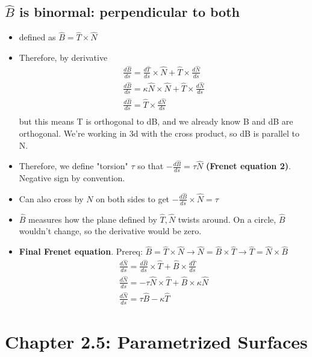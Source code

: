 \documentclass[11pt, oneside]{article}   	%
\begin{document}
\subsection{$\hat{B}$ is binormal: perpendicular to both}
\begin{itemize}
\item defined as $\hat{B} = \hat{T} \times \hat{N}$
\item Therefore, by derivative 
\begin{align}
\frac{d\hat{B}}{ds} = \frac{d\hat{T}}{ds} \times \hat{N} +  \hat{T} \times \frac{d\hat{N}}{ds}\\ 
\frac{d\hat{B}}{ds} = \kappa \hat{N} \times \hat{N}  +  \hat{T} \times \frac{d\hat{N}}{ds}\\ 
\frac{d\hat{B}}{ds} =  \hat{T} \times \frac{d\hat{N}}{ds}\\ 
\end{align}
but this means T is orthogonal to dB, and we already know B and dB are orthogonal.
We're working in 3d with the cross product, so dB is parallel to N.
\item Therefore, we define "torsion" $\tau$ so that $- \frac{d\hat{B}}{ds}  = \tau \hat{N}$  \textbf{(Frenet equation 2)}.  Negative sign by convention.
\item Can also cross by $N$ on both sides to get $- \frac{d\hat{B}}{ds}  \times \hat{N} = \tau $ 
\item $\hat{B}$ measures how the plane defined by $\hat{T}, \hat{N}$ twists around.  On a circle, $\hat{B}$ wouldn't change, so the derivative would be zero.
\item \textbf{Final Frenet equation}.  Prereq: $\hat{B} = \hat{T} \times \hat{N} \rightarrow \hat{N} = \hat{B} \times \hat{T} \rightarrow \hat{T} = \hat{N} \times \hat{B}$
\begin{align}
\frac{d\hat{N}}{ds} = \frac{d\hat{B}}{ds} \times \hat{T} +   \hat{B} \times  \frac{d\hat{T}}{ds} \\
\frac{d\hat{N}}{ds} = -\tau \hat{N} \times \hat{T} + \hat{B} \times \kappa \hat{N} \\ 
\frac{d\hat{N}}{ds}  = \tau \hat{B} - \kappa \hat{T}
\end{align}

\end{itemize}

\section{Chapter 2.5: Parametrized Surfaces}
\end{document}
